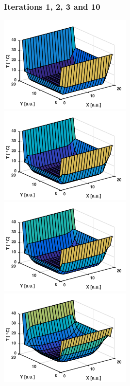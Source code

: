 \documentclass[11pt,table,final,xcolor={usenames,dvipsnames,table}]{beamer}
\begin{document}
\begin{frame}[fragile]
  \frametitle{Iterations 1, 2, 3 and 10}
  \includegraphics[width=0.5\textwidth]{img/it1}
  \includegraphics[width=0.5\textwidth]{img/it2}\\
  \includegraphics[width=0.5\textwidth]{img/it3}
  \includegraphics[width=0.5\textwidth]{img/it10}
\end{frame}
\end{document}
